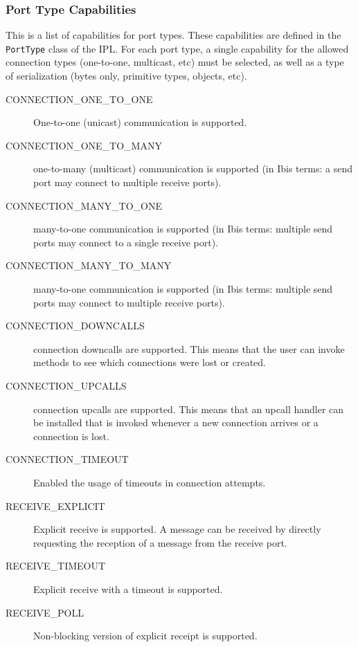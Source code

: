 \documentclass[10pt]{article}
\begin{document}
\subsubsection{Port Type Capabilities}
\label{portcapabilities}

This is a list of capabilities for port types. These capabilities are
defined in the \texttt{PortType} class of the IPL.  For each port
type, a single capability for the allowed connection types (one-to-one,
multicast, etc) must be selected, as well as a type of
serialization (bytes only, primitive types, objects, etc). 

\begin{description}
\item[CONNECTION\_ONE\_TO\_ONE]
One-to-one (unicast) communication is supported.

\item[CONNECTION\_ONE\_TO\_MANY]
one-to-many (multicast) communication is supported
(in Ibis terms: a send port
may connect to multiple receive ports).

\item[CONNECTION\_MANY\_TO\_ONE]
many-to-one communication is supported (in Ibis terms: multiple
send ports may connect to a single receive port).

\item[CONNECTION\_MANY\_TO\_MANY]
many-to-one communication is supported (in Ibis terms: multiple
send ports may connect to multiple receive ports).

\item[CONNECTION\_DOWNCALLS]
connection downcalls are supported. This means that the user can
invoke methods to see which connections were lost or created.

\item[CONNECTION\_UPCALLS]
connection upcalls are supported. This means that an upcall handler can
be installed that is invoked whenever a new connection arrives or a
connection is lost.

\item[CONNECTION\_TIMEOUT]
Enabled the usage of timeouts in connection attempts.

\item[RECEIVE\_EXPLICIT]
Explicit receive is supported. A message can be received by directly
requesting the reception of a message from the receive port.

\item[RECEIVE\_TIMEOUT]
Explicit receive with a timeout is supported.

\item[RECEIVE\_POLL]
Non-blocking version of explicit receipt is supported.


\end{description}
\end{document}
